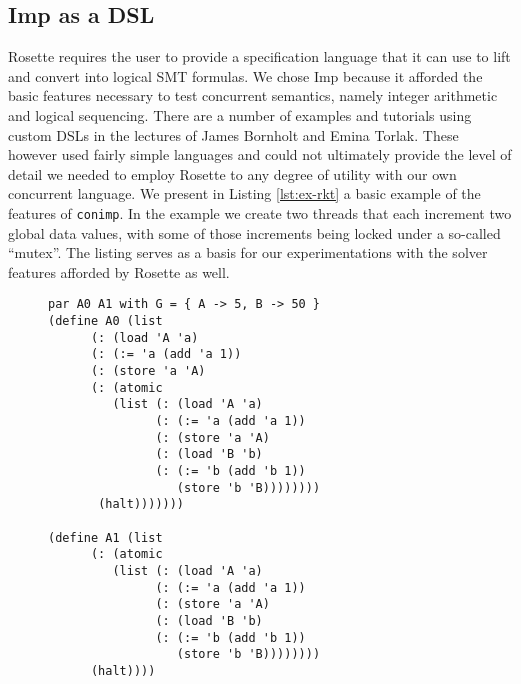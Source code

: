 \subsection{Imp as a DSL}
Rosette requires the user to provide a specification language that it can use to lift and convert into logical SMT formulas.  We chose Imp because it afforded the basic features necessary to test concurrent semantics, namely integer arithmetic and logical sequencing.  There are a number of examples and tutorials using custom DSLs  in the lectures of James Bornholt and Emina Torlak.  These however used fairly simple languages and could not ultimately provide the level of detail we needed to employ Rosette to any degree of utility with our own concurrent language.  We present in Listing \ref{lst:ex-rkt} a basic example of the features of \texttt{conimp}.  In the example we create two threads that each increment two global data values, with some of those increments being locked under a so-called ``mutex''.  The listing serves as a basis for our experimentations with the solver features afforded by Rosette as well.

\begin{figure}[!h]
\begin{lstlisting}[label={lst:ex-rkt},caption={Two threads concurrently updating a global store (\texttt{conimp}).},captionpos=b,frame=single,xleftmargin=1em]
par A0 A1 with G = { A -> 5, B -> 50 }  
(define A0 (list
      (: (load 'A 'a)
      (: (:= 'a (add 'a 1))
      (: (store 'a 'A)
      (: (atomic
         (list (: (load 'A 'a)
               (: (:= 'a (add 'a 1))
               (: (store 'a 'A)
               (: (load 'B 'b)
               (: (:= 'b (add 'b 1))
                  (store 'b 'B))))))))
       (halt)))))))

(define A1 (list
      (: (atomic
         (list (: (load 'A 'a)
               (: (:= 'a (add 'a 1))
               (: (store 'a 'A)
               (: (load 'B 'b)
               (: (:= 'b (add 'b 1))
                  (store 'b 'B))))))))
      (halt))))
  
\end{lstlisting}
\end{figure}

